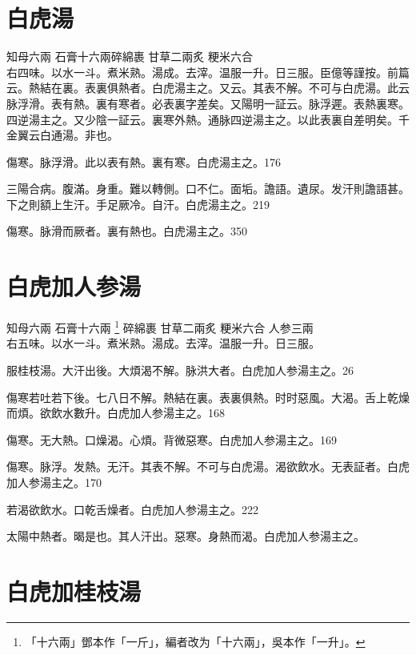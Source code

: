 \section{白虎湯}

知母{\scriptsize 六兩} 石膏{\scriptsize 十六兩碎綿裹} 甘草{\scriptsize 二兩炙} 粳米{\scriptsize 六合}\\
右四味。以水一斗。煮米熟。湯成。去滓。温服一升。日三服。{\scriptsize 臣億等謹按。前篇云。熱結在裏。表裏俱熱者。白虎湯主之。又云。其表不解。不可与白虎湯。此云脉浮滑。表有熱。裏有寒者。必表裏字差矣。又陽明一証云。脉浮遲。表熱裏寒。四逆湯主之。又少陰一証云。裏寒外熱。通脉四逆湯主之。以此表裏自差明矣。千金翼云白通湯。非也。}

傷寒。脉浮滑。此以表有熱。裏有寒。白虎湯主之。176

三陽合病。腹滿。身重。難以轉側。口不仁。面垢。譫語。遺尿。发汗則譫語{\khaai 甚}。下之則額上生汗。手足厥冷。自汗。白虎湯主之。219

傷寒。脉滑而厥者。裏有熱也。白虎湯主之。350

\section{白虎加人参湯}

知母{\scriptsize 六兩} 石膏{\scriptsize 十六兩
	\footnote{
	「十六兩」鄧本作「一斤」，編者改为「十六兩」，吳本作「一升」。
	}
碎綿裹} 甘草{\scriptsize 二兩炙} 粳米{\scriptsize 六合} 人参{\scriptsize 三兩}\\
右五味。以水一斗。煮米熟。湯成。去滓。温服一升。日三服。


服桂枝湯。大汗出{\khaai 後}。大煩渴不解。脉洪大者。白虎{\khaai 加人参}湯主之。26

傷寒若吐若下後。七八日不解。熱結在裏。表裏俱熱。时时惡風。大渴。舌上乾燥而煩。欲飲水數升。白虎{\khaai 加人参}湯主之。168

傷寒。无大熱。口燥渴。心煩。背微惡寒。白虎{\khaai 加人参}湯主之。169

傷寒。脉浮。发熱。无汗。其表不解。不可与白虎湯。渴欲飲水。无表証者。白虎{\khaai 加人参}湯主之。170

若渴欲飲水。口乾舌燥者。白虎{\khaai 加人参}湯主之。222

太陽中熱者。暍是也。其人汗出。惡寒。身熱而渴。白虎{\khaai 加人参}湯主之。

\section{白虎加桂枝湯}

